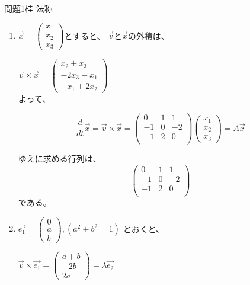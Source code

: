 \documentclass[fleqn]{jbook}
\begin{document}
\begin{answer}{問題1}{桂  法称}
\begin{enumerate}
\item 
$\overrightarrow{x}=\left(
     \begin{array}{c}
       x_1\\
       x_2\\
       x_3
     \end{array}\right)$とすると、
$\overrightarrow{v}$と$\overrightarrow{x}$の外積は、

$\overrightarrow{v} \times \overrightarrow{x} =
     \left(
     \begin{array}{c}
       x_2 +x_3\\
       -2x_3 - x_1\\
       -x_1 + 2x_2
     \end{array}\right)$\\
よって、

$$\frac{d}{dt}\overrightarrow{x} =
      \overrightarrow{v} \times \overrightarrow{x} = \left(
      \begin{array}{ccc}
        0 & 1 & 1 \\
       -1 & 0 & -2 \\
       -1 & 2 & 0 \\
      \end{array} \right)\left(
      \begin{array}{c}
       x_1\\
       x_2\\
       x_3
      \end{array}\right) =
      A \overrightarrow{x}$$

ゆえに求める行列は、
$$\left(
      \begin{array}{ccc}
        0 & 1 & 1 \\
       -1 & 0 & -2 \\
       -1 & 2 & 0 \\
      \end{array} \right) $$
である。

\item
$\overrightarrow{e_1} = \left(
     \begin{array}{c}
       0\\
       a\\
       b
     \end{array}\right), (a^2+b^2=1)$
とおくと、

$\overrightarrow{v} \times \overrightarrow{e_1} =  \left(
     \begin{array}{c}
       a+b\\
       -2b\\
       2a
     \end{array}\right) = \lambda \overrightarrow{e_2}$


\end{enumerate}
\end{answer}
\end{document}
